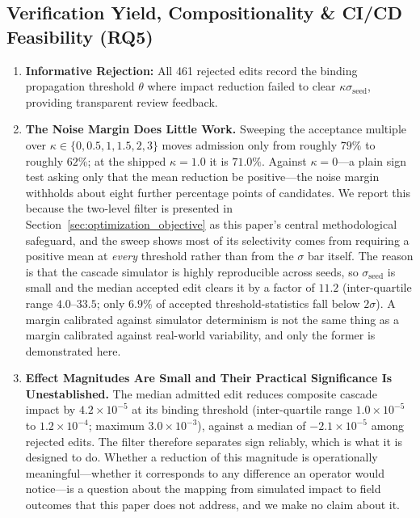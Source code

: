 \subsection{Verification Yield, Compositionality \& CI/CD Feasibility (RQ5)}
\label{sec:results:verification_yield}
\label{sec:results:performance}

\begin{enumerate}
    \item \textbf{Informative Rejection:} All 461 rejected edits record the binding propagation threshold $\theta$ where impact reduction failed to clear $\kappa \sigma_{\text{seed}}$, providing transparent review feedback.
    \item \textbf{The Noise Margin Does Little Work.} Sweeping the acceptance multiple over $\kappa \in \{0, 0.5, 1, 1.5, 2, 3\}$ moves admission only from roughly $79\%$ to roughly $62\%$; at the shipped $\kappa = 1.0$ it is $71.0\%$. Against $\kappa = 0$---a plain sign test asking only that the mean reduction be positive---the noise margin withholds about eight further percentage points of candidates. We report this because the two-level filter is presented in Section~\ref{sec:optimization_objective} as this paper's central methodological safeguard, and the sweep shows most of its selectivity comes from requiring a positive mean at \emph{every} threshold rather than from the $\sigma$ bar itself. The reason is that the cascade simulator is highly reproducible across seeds, so $\sigma_{\text{seed}}$ is small and the median accepted edit clears it by a factor of $11.2$ (inter-quartile range $4.0$--$33.5$; only $6.9\%$ of accepted threshold-statistics fall below $2\sigma$). A margin calibrated against simulator determinism is not the same thing as a margin calibrated against real-world variability, and only the former is demonstrated here.
    \item \textbf{Effect Magnitudes Are Small and Their Practical Significance Is Unestablished.} The median admitted edit reduces composite cascade impact by $4.2 \times 10^{-5}$ at its binding threshold (inter-quartile range $1.0 \times 10^{-5}$ to $1.2 \times 10^{-4}$; maximum $3.0 \times 10^{-3}$), against a median of $-2.1 \times 10^{-5}$ among rejected edits. The filter therefore separates sign reliably, which is what it is designed to do. Whether a reduction of this magnitude is operationally meaningful---whether it corresponds to any difference an operator would notice---is a question about the mapping from simulated impact to field outcomes that this paper does not address, and we make no claim about it.

\end{enumerate}
